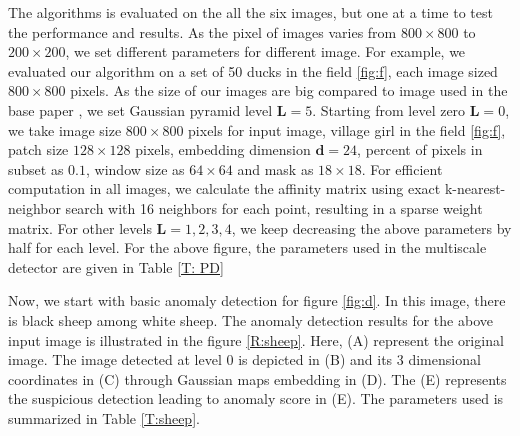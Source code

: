 The algorithms is evaluated on the all the six images, but one at a time to test the performance and results. As the pixel of images varies from $800\times800$ to $200\times200$, we set different parameters for different image. For example, we evaluated our algorithm on a set of 50 ducks in the field \ref{fig:f}, each image sized $800\times800$ pixels. As the size of our images are big compared to image used in the base paper \citep{Gal2013}, we set Gaussian pyramid level $\mathbf{L} = 5$. Starting from level zero  $\mathbf{L} = 0$, we take image size $800\times800$ pixels for input image, village girl in the field \ref{fig:f}, patch size $128\times128$ pixels, embedding dimension $\mathbf{d}=24$, percent of pixels in subset as $0.1$, window size as $64\times64$ and mask as $18\times18$. For efficient computation in all images, we calculate the affinity matrix using exact k-nearest-neighbor search with 16 neighbors for each point, resulting in a sparse weight matrix. For other levels $\mathbf{L}=1,2,3,4$, we keep decreasing the above parameters by half for each level. For the above figure, the parameters used in the multiscale detector are given
in Table \ref{T: PD}

Now, we start with basic anomaly detection for figure \ref{fig:d}. In this image, there is black sheep among white sheep. The anomaly detection results for the above input image is illustrated in the figure \ref{R:sheep}. Here, (A) represent the original image. The image detected at level 0 is depicted in (B) and its 3 dimensional coordinates in (C) through Gaussian maps embedding in (D). The (E) represents the suspicious detection leading to anomaly score in (E). The parameters used is summarized in Table \ref{T:sheep}.

